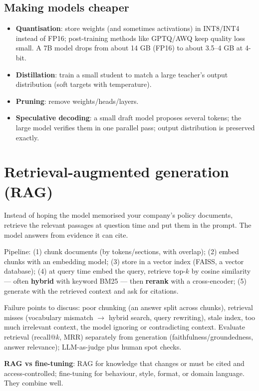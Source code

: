 \subsection{Making models cheaper}
\begin{itemize}
  \item \textbf{Quantisation}: store weights (and sometimes activations) in INT8/INT4 instead of FP16; post-training methods like GPTQ/AWQ keep quality loss small. A 7B model drops from about 14 GB (FP16) to about 3.5--4 GB at 4-bit.
  \item \textbf{Distillation}: train a small student to match a large teacher's output distribution (soft targets with temperature).
  \item \textbf{Pruning}: remove weights/heads/layers.
  \item \textbf{Speculative decoding}: a small draft model proposes several tokens; the large model verifies them in one parallel pass; output distribution is preserved exactly.
\end{itemize}

\section{Retrieval-augmented generation (RAG)}
\begin{intuition}
Instead of hoping the model memorised your company's policy documents, retrieve the relevant passages at question time and put them in the prompt. The model answers from evidence it can cite.
\end{intuition}
Pipeline: (1) chunk documents (by tokens/sections, with overlap); (2) embed chunks with an embedding model; (3) store in a vector index (FAISS, a vector database); (4) at query time embed the query, retrieve top-$k$ by cosine similarity --- often \textbf{hybrid} with keyword BM25 --- then \textbf{rerank} with a cross-encoder; (5) generate with the retrieved context and ask for citations.

Failure points to discuss: poor chunking (an answer split across chunks), retrieval misses (vocabulary mismatch $\to$ hybrid search, query rewriting), stale index, too much irrelevant context, the model ignoring or contradicting context. Evaluate retrieval (recall@$k$, MRR) separately from generation (faithfulness/groundedness, answer relevance); LLM-as-judge plus human spot checks.

\textbf{RAG vs fine-tuning}: RAG for knowledge that changes or must be cited and access-controlled; fine-tuning for behaviour, style, format, or domain language. They combine well.

